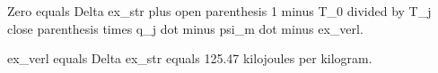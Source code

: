 Zero equals Delta ex_str plus open parenthesis 1 minus T_0 divided by T_j close parenthesis times q_j dot minus psi_m dot minus ex_verl.  

ex_verl equals Delta ex_str equals 125.47 kilojoules per kilogram.
